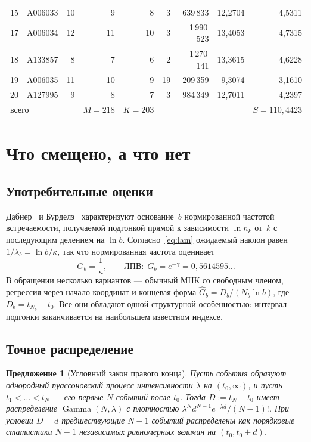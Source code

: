 \documentclass[11pt,a4paper]{article}
\theoremstyle{plain}
\newtheorem{proposition}{Предложение}
\theoremstyle{remark}
\newcommand{\emg}{e^{-\gamma}}
\DeclareMathOperator{\Gam}{Gamma}
\begin{document}
\begin{table}[t]
\begin{tabular}{rlrrrrrrr}
15 & A006033 & 10 & 9 & 8 & 3 & 639\,833 & 12{,}2704 & 4{,}5311\\
17 & A006034 & 12 & 11 & 10 & 3 & 1\,990\,523 & 13{,}4053 & 4{,}7315\\
18 & A133857 & 8 & 7 & 6 & 2 & 1\,270\,141 & 13{,}3615 & 4{,}6228\\
19 & A006035 & 11 & 10 & 9 & 19 & 209\,359 & 9{,}3074 & 3{,}1610\\
20 & A127995 & 9 & 8 & 7 & 3 & 984\,349 & 12{,}7011 & 4{,}2397\\
\midrule
\multicolumn{3}{l}{всего} & $M=218$ & $K=203$ & & & & $S=110{,}4423$\\
\bottomrule
\end{tabular}
\end{table}

\section{Что смещено, а что нет}\label{sec:notbias}

\subsection{Употребительные оценки}
Дабнер~\cite{dubner1993} и Бурделэ~\cite{bourdelais2009} характеризуют основание~$b$
нормированной частотой встречаемости, получаемой подгонкой прямой к зависимости
$\ln n_k$ от~$k$ с последующим делением на $\ln b$. Согласно~\eqref{eq:lam} ожидаемый
наклон равен $1/\lambda_b=\ln b/\kappa$, так что нормированная частота оценивает
\begin{equation}\label{eq:G}
G_b=\frac{1}{\kappa},\qquad\text{ЛПВ:}\ \ G_b=\emg=0{,}5614595\ldots
\end{equation}
В обращении несколько вариантов --- обычный МНК со свободным членом, регрессия через
начало координат и концевая форма $\hat G_b=D_b/(N_b\ln b)$, где $D_b=t_{N_b}-t_0$.
Все они обладают одной структурной особенностью: интервал подгонки заканчивается на наибольшем
известном индексе.

\subsection{Точное распределение}

\begin{proposition}[Условный закон правого конца]\label{prop:gamma}
Пусть события образуют однородный пуассоновский процесс интенсивности $\lambda$ на
$(t_0,\infty)$, и пусть $t_1<\dots<t_N$ --- его первые $N$ событий после $t_0$.
Тогда $D:=t_N-t_0$ имеет распределение $\Gam(N,\lambda)$ с плотностью
$\lambda^{N}d^{N-1}e^{-\lambda d}/(N-1)!$. При условии $D=d$ предшествующие $N-1$ событий
распределены как порядковые статистики $N-1$ независимых равномерных величин на
$(t_0,t_0+d)$.
\end{proposition}
\end{document}
